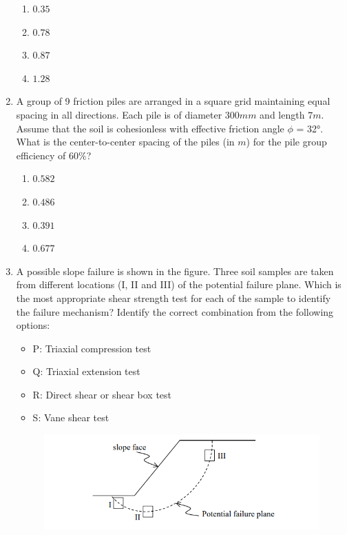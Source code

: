\documentclass[journal,12pt,onecolumn]{IEEEtran}
\theoremstyle{remark}
\begin{document}
\begin{enumerate}
\hfill{}
\begin{enumerate}
\item $0.35$
\item $0.78$
\item $0.87$
\item $1.28$
\end{enumerate}

\item A group of 9 friction piles are arranged in a square grid maintaining equal spacing in all directions. Each pile is of diameter $300 mm$ and length $7 m$. Assume that the soil is cohesionless with effective friction angle $\phi$ = 32°. What is the center-to-center spacing of the piles (in $m$) for the pile group efficiency of $60\%$?

\hfill{}
\begin{enumerate}
\item $0.582$
\item $0.486$
\item $0.391$
\item $0.677$
\end{enumerate}

\item A possible slope failure is shown in the figure. Three soil samples are taken from different locations (I, II and III) of the potential failure plane. Which is the most appropriate shear strength test for each of the sample to identify the failure mechanism? Identify the correct combination from the following options:

\hfill{}
\begin{itemize}
\item P: Triaxial compression test
\item Q: Triaxial extension test
\item R: Direct shear or shear box test
\item S: Vane shear test
\end{itemize}

\begin{figure}[H]
\centering
\includegraphics[width=0.5\linewidth]{figs/q18.png}
\caption*{}
\label{fig:Q.18}
\end{figure}


\end{enumerate}
\end{document}
